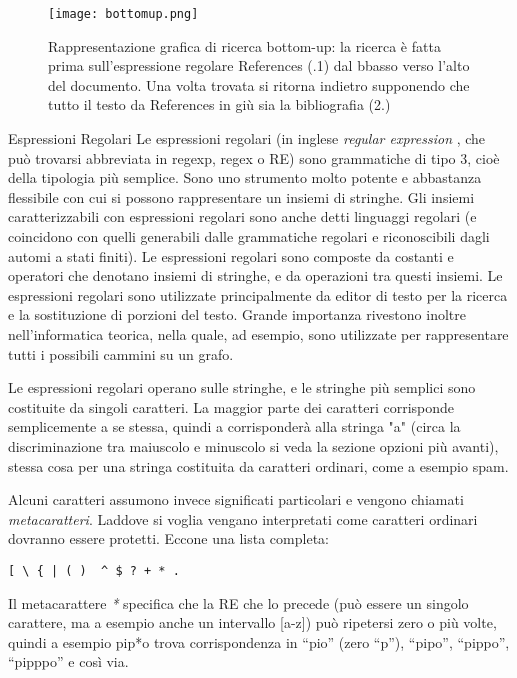 \begin{figure}[htb]
\begin{center}
\texttt{[image: bottomup.png]}
\end{center}
\caption[Rappresentazione grafica di ricerca bottom-up]{Rappresentazione grafica di ricerca bottom-up: la ricerca è fatta prima sull'espressione regolare References (.1) dal bbasso verso l'alto del documento. Una volta trovata si ritorna indietro supponendo che tutto il testo da References in giù sia la bibliografia (2.) }
\label{fig:bottomup}
\end{figure}

\begin{subsubsection}{Espressioni Regolari}
 Le espressioni regolari (in inglese \textit{regular expression} \cite{regexp}, che può trovarsi abbreviata in regexp, regex o RE) sono grammatiche di tipo 3, cioè della tipologia più semplice. Sono uno strumento molto potente e abbastanza flessibile con cui si possono rappresentare un insiemi di stringhe. Gli insiemi caratterizzabili con espressioni regolari sono anche detti linguaggi regolari (e coincidono con quelli generabili dalle grammatiche regolari e riconoscibili dagli automi a stati finiti). Le espressioni regolari sono composte da costanti e operatori che denotano insiemi di stringhe, e da operazioni tra questi insiemi. Le espressioni regolari sono utilizzate principalmente da editor di testo per la ricerca e la sostituzione di porzioni del testo. Grande importanza rivestono inoltre nell'informatica teorica, nella quale, ad esempio, sono utilizzate per rappresentare tutti i possibili cammini su un grafo.

Le espressioni regolari operano sulle stringhe, e le stringhe più semplici sono costituite da singoli caratteri. La maggior parte dei caratteri corrisponde semplicemente a se stessa, quindi a corrisponderà alla stringa "a" (circa la discriminazione tra maiuscolo e minuscolo si veda la sezione opzioni più avanti), stessa cosa per una stringa costituita da caratteri ordinari, come a esempio spam.

Alcuni caratteri assumono invece significati particolari e vengono chiamati \textit{metacaratteri}. Laddove si voglia vengano interpretati come caratteri ordinari dovranno essere protetti. Eccone una lista completa:

\begin{verbatim}
[ \ { | ( )  ^ $ ? + * .
\end{verbatim}

Il metacarattere \textit{*} specifica che la RE che lo precede (può essere un singolo carattere, ma a esempio anche un intervallo [a-z]) può ripetersi zero o più volte, quindi a esempio pip*o trova corrispondenza in ``pio'' (zero ``p''), ``pipo'', ``pippo'', ``pipppo'' e così via.\\


\end{subsubsection}
